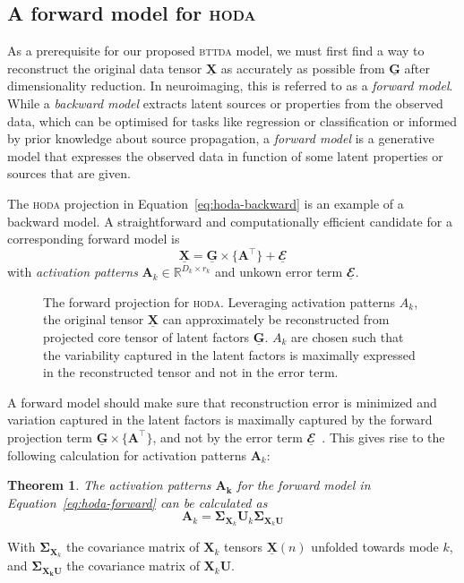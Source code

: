 \documentclass[twocolumn]{article}
\newcommand{\ten}[1]{\underline{\mathbf{#1}}} %
\newcommand{\mat}[1]{\mathbf{#1}} %
\newcommand{\mmpr}[1]{\times\{#1\}} %
\newtheorem{theorem}{Theorem}
\begin{document}
\subsection{A forward model for \textsc{hoda}}
As a prerequisite for our proposed \textsc{bttda} model, we must first find a
way to reconstruct the original data tensor $\ten{X}$ as accurately as possible
from $\ten{G}$ after dimensionality reduction.
In neuroimaging, this is referred to as a \textit{forward model}.
While a \textit{backward model} extracts latent sources or properties from the observed
data, which can be optimised for tasks like regression or classification or
informed by prior knowledge about source propagation, a \textit{forward model} is a
generative model that expresses the observed data in function of some latent
properties or sources that are given.

The \textsc{hoda} projection in Equation~\ref{eq:hoda-backward} is an example
of a backward model.
A straightforward and computationally efficient candidate for a corresponding
forward model is
\begin{equation}
	\ten{X} = \ten{G}\mmpr{\mat{A}^\intercal} + \ten{\mathbfcal{E}}
	\label{eq:hoda-forward}
\end{equation}
with \textit{activation patterns} $\mat{A}_k \in \mathbb{R}^{D_k\times r_k}$
and unkown error term $\ten{\mathbfcal{E}}$.
\begin{figure}
	\centering
	
	\caption{The forward projection for \textsc{hoda}. Leveraging activation
		patterns $A_k$, the original tensor $\ten{X}$ can approximately be
		reconstructed from projected core tensor of latent factors $\ten{G}$. $A_k$ are chosen such
		that the variability captured in the latent factors is maximally expressed in
		the reconstructed tensor and not in the error term.}
	\label{fig:hoda-forward}
\end{figure}

A forward model should make sure that reconstruction error is minimized and
variation captured in the latent factors is maximally captured by the forward
projection term $\ten{G}\mmpr{\mat{A}^\intercal}$, and not by the error term
$\ten{\mathbfcal{E}}$~\cite{Haufe2014}.
This gives rise to the following calculation for activation patterns
$\mat{A}_k$:
\begin{theorem}
	The activation patterns $\mat{A_k}$ for the forward model in
	Equation~\ref{eq:hoda-forward} can be calculated as
	\begin{equation}
    \mat{A}_k =
    \mat{\Sigma}_{\mat{X}_k}\mat{U}_k\mat{\Sigma}_{\mat{X}_k\mat{U}}
		\label{eq:ap}
	\end{equation}
	\label{the:ap}
\end{theorem}
With $\mat{\Sigma}_{\mat{X}_k}$ the covariance matrix of $\mat{X}_k$ tensors $\ten{X}(n)$
unfolded towards mode $k$, and $\mat{\Sigma_{X_kU}}$  the covariance matrix of
$\mat{X}_k\mat{U}$.
\end{document}
